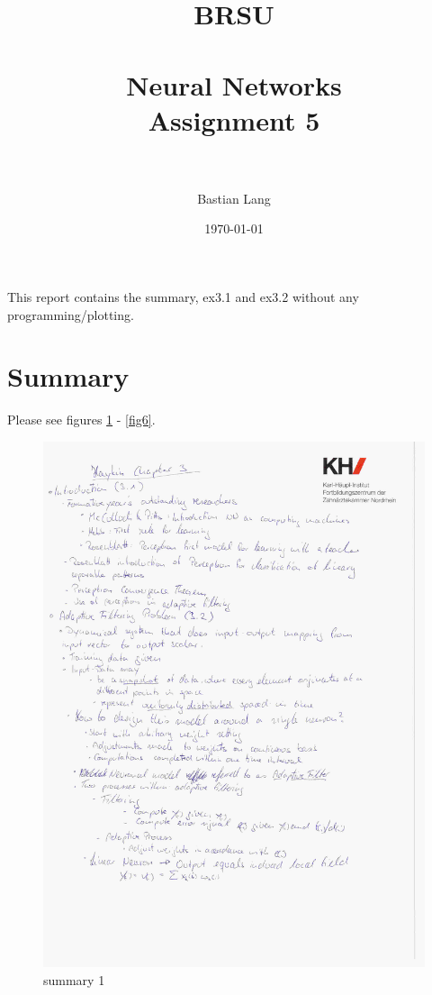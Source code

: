 \documentclass[paper=a4, fontsize=11pt]{scrartcl} %
\title{	
\normalfont \normalsize 
\textsc{BRSU} \\ [25pt] %
\horrule{0.5pt} \\[0.4cm] %
\huge Neural Networks\\Assignment 5 \\ %
\horrule{2pt} \\[0.5cm] %
}
\author{Bastian Lang} %
\date{\normalsize\today} %
\numberwithin{equation}{section} %
\numberwithin{figure}{section} %
\numberwithin{table}{section} %
\begin{document}
\maketitle %

\newpage

This report contains the summary, ex3.1 and ex3.2 without any programming/plotting.

\section{Summary}
Please see figures \ref{fig1} - \ref{fig6}.
\begin{figure}[ht]
	\centering
  \includegraphics[width=0.7\textheight]{04.jpg}
	\caption{summary 1}
	\label{fig1}
\end{figure}
\end{document}
